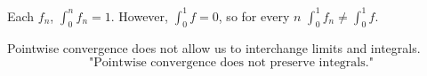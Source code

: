\begin{observation}
    Each $f_n$, $\int_0^n f_n = 1$. However, $\int_0^1 f = 0$, so for every $n$ $\int_0^1 f_n \neq \int_0^1 f.$
\end{observation}

\begin{remark}
    Pointwise convergence does not allow us to interchange limits and integrals.
    $$\text{"Pointwise convergence does not preserve integrals."}$$
\end{remark}
